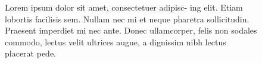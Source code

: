\documentclass[twocolumn]{article}
\begin{document}
\begin{figure}
  \centering
  
  \caption{
Lorem ipsum dolor sit amet, consectetuer adipisc-
ing elit. Etiam lobortis facilisis sem. Nullam nec mi et neque
pharetra sollicitudin. Praesent imperdiet mi nec ante. Donec
ullamcorper, felis non sodales commodo, lectus velit ultrices
augue, a dignissim nibh lectus placerat pede.}
\end{figure}

\Blindtext
\Blindtext
\end{document}
